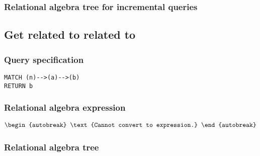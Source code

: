 \subsubsection*{Relational algebra tree for incremental queries}


\subsection{Get related to related to}

\subsubsection*{Query specification}

\begin{lstlisting}
MATCH (n)-->(a)-->(b)
RETURN b
\end{lstlisting}

\subsubsection*{Relational algebra expression}

\begin{align*}
\begin{autobreak}
\text{Cannot convert to expression.}
\end{autobreak}
\end{align*}

\subsubsection*{Relational algebra tree}


